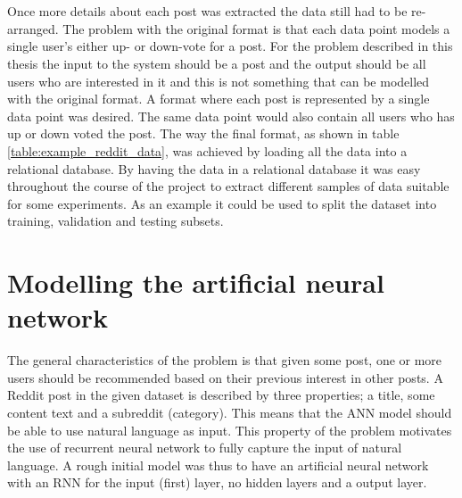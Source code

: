 \\\\
Once more details about each post was extracted the data still had to be re-arranged. The problem with the original format is that each data point models a single user's either up- or down-vote for a post. For the problem described in this thesis the input to the system should be a post and the output should be all users who are interested in it and this is not something that can be modelled with the original format. A format where each post is represented by a single data point was desired. The same data point would also contain all users who has up or down voted the post. The way the final format, as shown in table \ref{table:example_reddit_data}, was achieved by loading all the data into a relational database. By having the data in a relational database it was easy throughout the course of the project to extract different samples of data suitable for some experiments. As an example it could be used to split the dataset into training, validation and testing subsets.

\section{Modelling the artificial neural network}\label{sec:modelling_the_ann}
The general characteristics of the problem is that given some post, one or more users should be recommended based on their previous interest in other posts. A Reddit post in the given dataset is described by three properties; a title, some content text and a subreddit (category). This means that the ANN model should be able to use natural language as input. This property of the problem motivates the use of recurrent neural network to fully capture the input of natural language. A rough initial model was thus to have an artificial neural network with an RNN for the input (first) layer, no hidden layers and a output layer.

